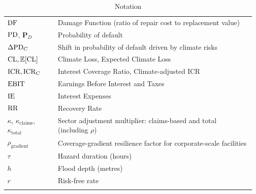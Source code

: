 \begin{longtable}[c]{l|p{10cm}}
$\text{DF}$ & Damage Function (ratio of repair cost to replacement value) \\
$\text{PD}$, $\mathbf{P}_D$ & Probability of default\\
$\Delta \text{PD}_C$ & Shift in probability of default driven by climate risks\\
$\text{CL}, \mathbb{E}[\text{CL}]$ & Climate Loss, Expected Climate Loss \\
$\text{ICR}, \text{ICR}_C$ & Interest Coverage Ratio, Climate-adjusted ICR \\
$\text{EBIT}$ & Earnings Before Interest and Taxes \\
$\text{IE}$ & Interest Expenses \\
$\text{RR}$ & Recovery Rate \\
$\kappa$, $\kappa_{\text{claims}}$, $\kappa_{\text{total}}$ & Sector adjustment multiplier: claims-based and total (including $\rho$) \\
$\rho_{\text{gradient}}$ & Coverage-gradient resilience factor for corporate-scale facilities \\
$\tau$ & Hazard duration (hours) \\
$h$ & Flood depth (metres) \\
$r$ & Risk-free rate\\[1ex]
\caption{Notation}
\end{longtable}
